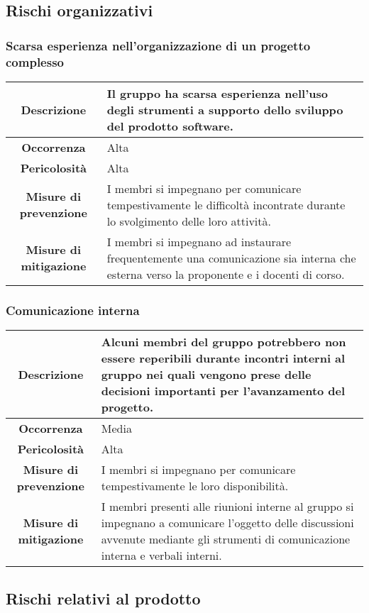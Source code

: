 \subsection{Rischi organizzativi}
\subsubsection{Scarsa esperienza nell'organizzazione di un progetto complesso }
\begin{tabular}{|c|p{10cm}|}
\hline
\textbf{Descrizione} & Il gruppo ha scarsa esperienza nell'uso degli strumenti a supporto dello sviluppo del prodotto software. \\
\hline
\textbf{Occorrenza} & Alta \\
\hline
\textbf{Pericolosità} & Alta \\
\hline
\textbf{Misure di prevenzione} & I membri si impegnano per comunicare tempestivamente le difficoltà incontrate durante lo svolgimento delle loro attività. \\
\hline
\textbf{Misure di mitigazione} & I membri si impegnano ad instaurare frequentemente una comunicazione sia interna che esterna verso la proponente e i docenti di corso. \\
\hline
\end{tabular}

\subsubsection{Comunicazione interna}
\begin{tabular}{|c|p{10cm}|}
\hline
\textbf{Descrizione} & Alcuni membri del gruppo potrebbero non essere reperibili durante incontri interni al gruppo nei quali vengono prese delle decisioni importanti per l'avanzamento del progetto.\\
\hline
\textbf{Occorrenza} & Media \\
\hline
\textbf{Pericolosità} & Alta \\
\hline
\textbf{Misure di prevenzione} & I membri si impegnano per comunicare tempestivamente le loro disponibilità. \\
\hline
\textbf{Misure di mitigazione} & I membri presenti alle riunioni interne al gruppo si impegnano a comunicare l'oggetto delle discussioni avvenute mediante gli strumenti di comunicazione interna e verbali interni. \\
\hline
\end{tabular}

\subsection{Rischi relativi al prodotto}
